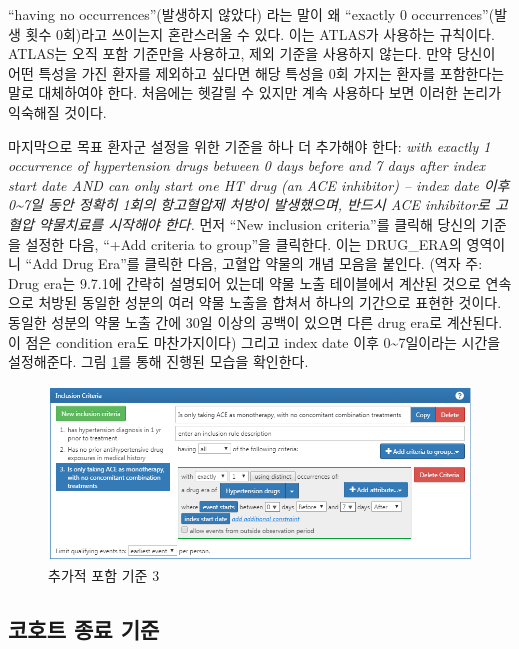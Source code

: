 \documentclass[10.5pt]{book}
\theoremstyle{definition}
\theoremstyle{definition}
\theoremstyle{definition}
\theoremstyle{remark}
\begin{document}
``having no occurrences''(발생하지 않았다) 라는 말이 왜 ``exactly 0
occurrences''(발생 횟수 0회)라고 쓰이는지 혼란스러울 수 있다. 이는
ATLAS가 사용하는 규칙이다. ATLAS는 오직 포함 기준만을 사용하고, 제외
기준을 사용하지 않는다. 만약 당신이 어떤 특성을 가진 환자를 제외하고
싶다면 해당 특성을 0회 가지는 환자를 포함한다는 말로 대체하여야 한다.
처음에는 헷갈릴 수 있지만 계속 사용하다 보면 이러한 논리가 익숙해질
것이다.

마지막으로 목표 환자군 설정을 위한 기준을 하나 더 추가해야 한다:
\emph{with exactly 1 occurrence of hypertension drugs between 0 days
before and 7 days after index start date AND can only start one HT drug
(an ACE inhibitor) -- index date 이후 0\textasciitilde{}7일 동안 정확히
1회의 항고혈압제 처방이 발생했으며, 반드시 ACE inhibitor로 고혈압
약물치료를 시작해야 한다.} 먼저 ``New inclusion criteria''를 클릭해
당신의 기준을 설정한 다음, ``+Add criteria to group''을 클릭한다. 이는
DRUG\_ERA의 영역이니 ``Add Drug Era''를 클릭한 다음, 고혈압 약물의 개념
모음을 붙인다. (역자 주: Drug era는 9.7.1에 간략히 설명되어 있는데 약물
노출 테이블에서 계산된 것으로 연속으로 처방된 동일한 성분의 여러 약물
노출을 합쳐서 하나의 기간으로 표현한 것이다. 동일한 성분의 약물 노출
간에 30일 이상의 공백이 있으면 다른 drug era로 계산된다. 이 점은
condition era도 마찬가지이다) 그리고 index date 이후
0\textasciitilde{}7일이라는 시간을 설정해준다. 그림 \ref{fig:ATLASIC3}를
통해 진행된 모습을 확인한다.

\begin{figure}

{\centering \includegraphics[width=1\linewidth]{images/Cohorts/ATLAS-IC3} 

}

\caption{추가적 포함 기준 3}\label{fig:ATLASIC3}
\end{figure}

\subsection{코호트 종료 기준}\label{--}
\end{document}
